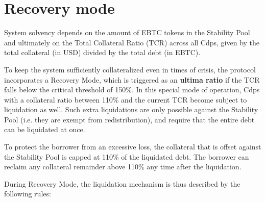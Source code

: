 \documentclass{article}
\begin{document}
\section{Recovery mode}
System solvency depends on the amount of EBTC tokens in the Stability Pool and ultimately on the Total Collateral Ratio (TCR) across all Cdps, given by the total collateral (in USD) divided by the total debt (in EBTC). 

To keep the system sufficiently collateralized even in times of crisis, the protocol incorporates a Recovery Mode, which is triggered as an \textbf{ultima ratio} if the TCR falls below the critical threshold of 150\%. In this special mode of operation, Cdps with a collateral ratio between 110\% and the current TCR become subject to liquidation as well. Such extra liquidations are only possible against the Stability Pool (i.e. they are exempt from redistribution), and require that the entire debt can be liquidated at once. 

To protect the borrower from an excessive loss, the collateral that is offset against the Stability Pool is capped at 110\% of the liquidated debt. The borrower can reclaim any collateral remainder above 110\% any time after the liquidation.

During Recovery Mode, the liquidation mechanism is thus described by the following rules:\\
\end{document}
